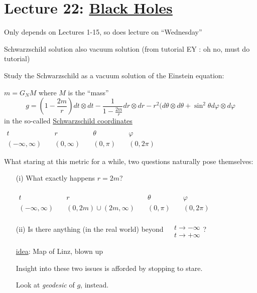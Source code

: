 \section{Lecture 22: \underline{Black Holes}}

Only depends on Lectures 1-15, so does lecture on ``Wednesday''

Schwarzschild solution also vacuum solution (from tutorial EY : oh no, must do tutorial)

Study the Schwarzschild as a vacuum solution of the Einstein equation:

$m = G_N M$ where $M$ is the ``mass''
\[
g = \left( 1 - \frac{2m}{r} \right) dt \otimes dt - \frac{1}{ 1 - \frac{2m}{r} } dr \otimes dr - r^2 ( d\theta \otimes d\theta + \sin^2{\theta} d\varphi \otimes d\varphi
\]
in the so-called \underline{Schwarzschild coordinates}  $\begin{aligned} & & & & \quad \\
 t \quad & r \quad & \theta \quad & \varphi \\ 
 (-\infty,\infty) \quad & (0,\infty) \quad & (0,\pi) \quad & (0,2\pi) \end{aligned}$

What staring at this metric for a while, two questions naturally pose themselves:

\begin{enumerate}
\item[(i)] What exactly happens \@ $r= 2m$?

$\begin{aligned} & & & & \quad \\
 t \quad & r \quad & \theta \quad & \varphi \\ 
 (-\infty,\infty) \quad & (0,2m) \cup ( 2m, \infty) \quad & (0,\pi) \quad & (0,2\pi) \end{aligned}$


\item[(ii)] Is there anything (in the real world) beyond $\begin{aligned} & \quad \\
  & t \to -\infty \\
  & t\to +\infty \end{aligned}$?

\underline{idea}: Map of Linz, blown up

Insight into these two issues is afforded by stopping to stare.  

Look at \emph{geodesic} of $g$, instead.

\end{enumerate}

